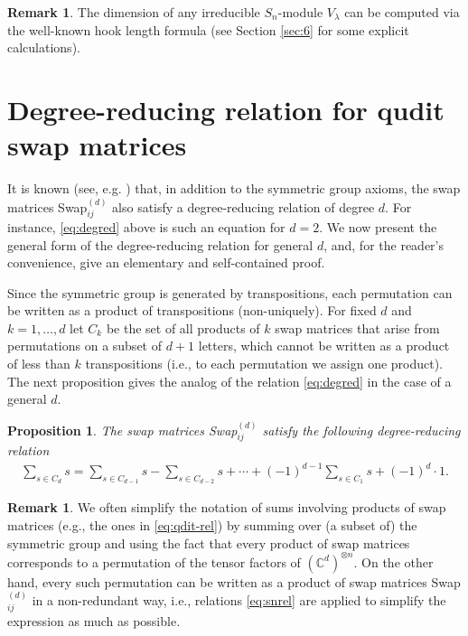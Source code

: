 \documentclass[12pt,dvipsnames,accepted=2016-08-18,a4paper,onecolumn]{quantumarticle}
\numberwithin{equation}{section}
\newcommand{\CC}{\mathbb C}
\newtheorem{proposition}[theorem]{Proposition}
\theoremstyle{definition}
\newtheorem{remark}[theorem]{Remark}
\begin{document}
\begin{remark}
    The dimension of any irreducible $S_n$-module $V_\lambda$ can be computed via the well-known hook length formula (see Section \ref{sec:6} for some explicit calculations).
\end{remark}



\section{Degree-reducing relation for qudit swap matrices}\label{sec:qudit-rel}

    It is known (see, e.g. \cite[Section 9.3]{Probook}) that, in addition to the symmetric group axioms, the swap matrices Swap$^{(d)}_{ij}$ also satisfy a degree-reducing relation 
    of degree $d.$ For instance, 
    \eqref{eq:degred} above is such an equation for $d=2$.
    We now present the general form of 
    the degree-reducing relation for general $d$,
    and, for the reader's convenience, give an elementary and self-contained proof. 

Since the symmetric group is generated by transpositions, each permutation can be written as a product of transpositions (non-uniquely).
For fixed $d$ and $k=1,\ldots, d$ let $C_k$ be the set of all products of $k$ swap matrices that arise from permutations on a subset of $d+1$ letters, which cannot be written as a product of less than $k$ transpositions (i.e., to each permutation we assign one product).
The next proposition gives 
the analog of the relation \eqref{eq:degred} in the case of a general $d.$

\begin{proposition}\label{prop:degred} The swap matrices Swap$^{(d)}_{ij}$ satisfy the following degree-reducing relation
    \begin{align}\label{eq:qdit-rel}
	\sum_{s \in C_d} s = \sum_{s \in C_{d-1}} s - \sum_{s \in C_{d-2}} s + \cdots + (-1)^{d-1} \sum_{s \in C_1} s + (-1)^d \cdot 1.
\end{align}
\end{proposition}


\begin{remark}\label{rem:nonred} We often simplify the notation of sums involving products of swap matrices (e.g., the ones in \eqref{eq:qdit-rel}) by summing over (a subset of) the symmetric group and using the fact that every product of swap matrices corresponds to a permutation of the tensor factors of $(\CC^d)^{\otimes n}.$ On the other hand, every such permutation can be written as a product of swap matrices Swap$^{(d)}_{ij}$ in a non-redundant way, i.e., relations \eqref{eq:snrel} are applied to simplify the expression as much as possible. 
\end{remark}
\end{document}
